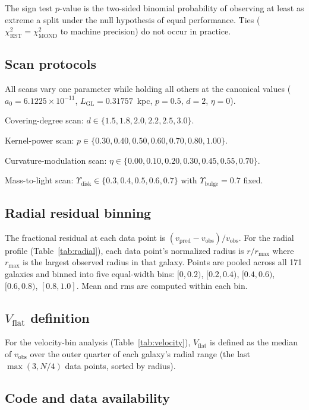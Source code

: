 \documentclass[11pt,a4paper]{article}
\begin{document}
The sign test $p$-value is the two-sided binomial probability of observing at least as extreme a split under the null hypothesis of equal performance.
Ties ($\chi^2_{\mathrm{RST}} = \chi^2_{\mathrm{MOND}}$ to machine precision) do not occur in practice.

\subsection{Scan protocols}

All scans vary one parameter while holding all others at the canonical values ($a_0 = 6.1225 \times 10^{-11}$, $L_{\mathrm{GL}} = 0.31757$~kpc, $p = 0.5$, $d = 2$, $\eta = 0$).

Covering-degree scan: $d \in \{1.5, 1.8, 2.0, 2.2, 2.5, 3.0\}$.

Kernel-power scan: $p \in \{0.30, 0.40, 0.50, 0.60, 0.70, 0.80, 1.00\}$.

Curvature-modulation scan: $\eta \in \{0.00, 0.10, 0.20, 0.30, 0.45, 0.55, 0.70\}$.

Mass-to-light scan: $\Upsilon_{\mathrm{disk}} \in \{0.3, 0.4, 0.5, 0.6, 0.7\}$ with $\Upsilon_{\mathrm{bulge}} = 0.7$ fixed.

\subsection{Radial residual binning}

The fractional residual at each data point is $(v_{\mathrm{pred}} - v_{\mathrm{obs}})/v_{\mathrm{obs}}$.
For the radial profile (Table~\ref{tab:radial}), each data point's normalized radius is $r/r_{\max}$ where $r_{\max}$ is the largest observed radius in that galaxy.
Points are pooled across all 171 galaxies and binned into five equal-width bins: $[0, 0.2)$, $[0.2, 0.4)$, $[0.4, 0.6)$, $[0.6, 0.8)$, $[0.8, 1.0]$.
Mean and rms are computed within each bin.

\subsection{$V_{\mathrm{flat}}$ definition}

For the velocity-bin analysis (Table~\ref{tab:velocity}), $V_{\mathrm{flat}}$ is defined as the median of $v_{\mathrm{obs}}$ over the outer quarter of each galaxy's radial range (the last $\max(3, N/4)$ data points, sorted by radius).

\subsection{Code and data availability}
\end{document}
